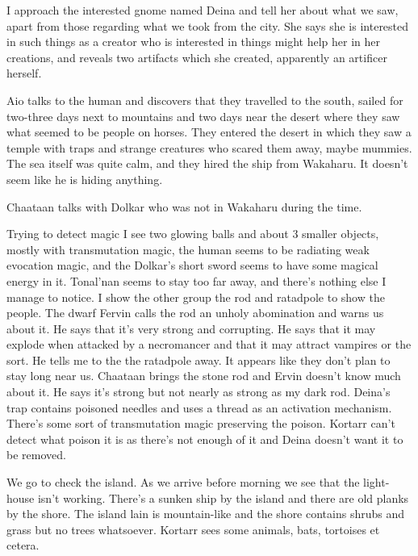 \documentclass[10pt,a4paper,twoside,openany,hidelinks]{book}
\begin{document}
I approach the interested gnome named Deina and tell her about what we saw, apart from those regarding what we took from the city. She says she is interested in such things as a creator who is interested in things might help her in her creations, and reveals two artifacts which she created, apparently an artificer herself.

Aio talks to the human and discovers that they travelled to the south, sailed for two-three days next to mountains and two days near the desert where they saw what seemed to be people on horses. They entered the desert in which they saw a temple with traps and strange creatures who scared them away, maybe mummies. The sea itself was quite calm, and they hired the ship from Wakaharu. It doesn't seem like he is hiding anything.

Chaataan talks with Dolkar who was not in Wakaharu during the time.

Trying to detect magic I see two glowing balls and about 3 smaller objects, mostly with transmutation magic, the human seems to be radiating weak evocation magic, and the Dolkar's short sword seems to have some magical energy in it. Tonal'nan seems to stay too far away, and there's nothing else I manage to notice.
I show the other group the rod and ratadpole to show the people. The dwarf Fervin calls the rod an unholy abomination and warns us about it. He says that it's very strong and corrupting. He says that it may explode when attacked by a necromancer and that it may attract vampires or the sort. He tells me to the the ratadpole away. It appears like they don't plan to stay long near us.
Chaataan brings the stone rod and Ervin doesn't know much about it. He says it's strong but not nearly as strong as my dark rod.
Deina's trap contains poisoned needles and uses a thread as an activation mechanism. There's some sort of transmutation magic preserving the poison. 
Kortarr can't detect what poison it is as there's not enough of it and Deina doesn't want it to be removed.

We go to check the island. As we arrive before morning we see that the light-house isn't working. There's a sunken ship by the island and there are old planks by the shore. The island lain is mountain-like and the shore contains shrubs and grass but no trees whatsoever. Kortarr sees some animals, bats, tortoises et cetera.
\end{document}

